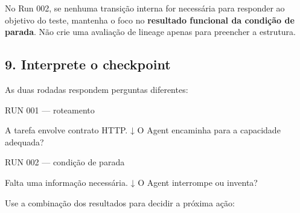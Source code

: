 \documentclass[
  10pt,
  a4paper,
  oneside]{book}
\newenvironment{Shaded}{}{}
\newcommand{\NormalTok}[1]{#1}
\renewenvironment{Shaded}{\begin{snugshade}}{\end{snugshade}}%
\begin{document}
No Run 002, se nenhuma transição interna for necessária para responder
ao objetivo do teste, mantenha o foco no \textbf{resultado funcional da
condição de parada}. Não crie uma avaliação de lineage apenas para
preencher a estrutura.

\hypertarget{interprete-o-checkpoint}{%
\subsection{9. Interprete o checkpoint}\label{interprete-o-checkpoint}}

As duas rodadas respondem perguntas diferentes:

\begin{Shaded}
\begin{Highlighting}[]
\NormalTok{RUN 001 — roteamento}

\NormalTok{A tarefa envolve contrato HTTP.}
\NormalTok{        ↓}
\NormalTok{O Agent encaminha para a capacidade adequada?}
\end{Highlighting}
\end{Shaded}

\begin{Shaded}
\begin{Highlighting}[]
\NormalTok{RUN 002 — condição de parada}

\NormalTok{Falta uma informação necessária.}
\NormalTok{        ↓}
\NormalTok{O Agent interrompe ou inventa?}
\end{Highlighting}
\end{Shaded}

Use a combinação dos resultados para decidir a próxima ação:
\end{document}
